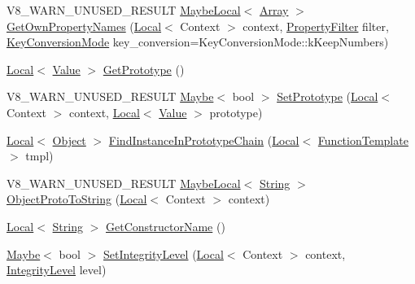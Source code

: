 \begin{DoxyCompactItemize}
\item 
V8\+\_\+\+W\+A\+R\+N\+\_\+\+U\+N\+U\+S\+E\+D\+\_\+\+R\+E\+S\+U\+LT \mbox{\hyperlink{classv8_1_1MaybeLocal}{Maybe\+Local}}$<$ \mbox{\hyperlink{classv8_1_1Array}{Array}} $>$ \mbox{\hyperlink{classv8_1_1Object_a345cc5b8e646c89bdf03b76f60544c91}{Get\+Own\+Property\+Names}} (\mbox{\hyperlink{classv8_1_1Local}{Local}}$<$ Context $>$ context, \mbox{\hyperlink{namespacev8_afbf02b6b1152a3e25d7bde90798209ac}{Property\+Filter}} filter, \mbox{\hyperlink{namespacev8_aa65aeff871614520d8033dead4b34e38}{Key\+Conversion\+Mode}} key\+\_\+conversion=Key\+Conversion\+Mode\+::k\+Keep\+Numbers)
\item 
\mbox{\hyperlink{classv8_1_1Local}{Local}}$<$ \mbox{\hyperlink{classv8_1_1Value}{Value}} $>$ \mbox{\hyperlink{classv8_1_1Object_ae8d3fed7d6dbd667c29cabb3039fe7af}{Get\+Prototype}} ()
\item 
V8\+\_\+\+W\+A\+R\+N\+\_\+\+U\+N\+U\+S\+E\+D\+\_\+\+R\+E\+S\+U\+LT \mbox{\hyperlink{classv8_1_1Maybe}{Maybe}}$<$ bool $>$ \mbox{\hyperlink{classv8_1_1Object_a1f1fc25d2a440ad2a8b7d94db04f88fb}{Set\+Prototype}} (\mbox{\hyperlink{classv8_1_1Local}{Local}}$<$ Context $>$ context, \mbox{\hyperlink{classv8_1_1Local}{Local}}$<$ \mbox{\hyperlink{classv8_1_1Value}{Value}} $>$ prototype)
\item 
\mbox{\hyperlink{classv8_1_1Local}{Local}}$<$ \mbox{\hyperlink{classv8_1_1Object}{Object}} $>$ \mbox{\hyperlink{classv8_1_1Object_ae2ad9fee9db6e0e5da56973ebb8ea2bc}{Find\+Instance\+In\+Prototype\+Chain}} (\mbox{\hyperlink{classv8_1_1Local}{Local}}$<$ \mbox{\hyperlink{classv8_1_1FunctionTemplate}{Function\+Template}} $>$ tmpl)
\item 
V8\+\_\+\+W\+A\+R\+N\+\_\+\+U\+N\+U\+S\+E\+D\+\_\+\+R\+E\+S\+U\+LT \mbox{\hyperlink{classv8_1_1MaybeLocal}{Maybe\+Local}}$<$ \mbox{\hyperlink{classv8_1_1String}{String}} $>$ \mbox{\hyperlink{classv8_1_1Object_a7a65552d78eff4a1b9755f99167f4255}{Object\+Proto\+To\+String}} (\mbox{\hyperlink{classv8_1_1Local}{Local}}$<$ Context $>$ context)
\item 
\mbox{\hyperlink{classv8_1_1Local}{Local}}$<$ \mbox{\hyperlink{classv8_1_1String}{String}} $>$ \mbox{\hyperlink{classv8_1_1Object_a7bbe987794658f20a3ec1b68326305e6}{Get\+Constructor\+Name}} ()
\item 
\mbox{\hyperlink{classv8_1_1Maybe}{Maybe}}$<$ bool $>$ \mbox{\hyperlink{classv8_1_1Object_ac45163422a18bb7481cc78fcacecb301}{Set\+Integrity\+Level}} (\mbox{\hyperlink{classv8_1_1Local}{Local}}$<$ Context $>$ context, \mbox{\hyperlink{namespacev8_a02642d03ff1eecc2fd358626499c2e30}{Integrity\+Level}} level)

\end{DoxyCompactItemize}
